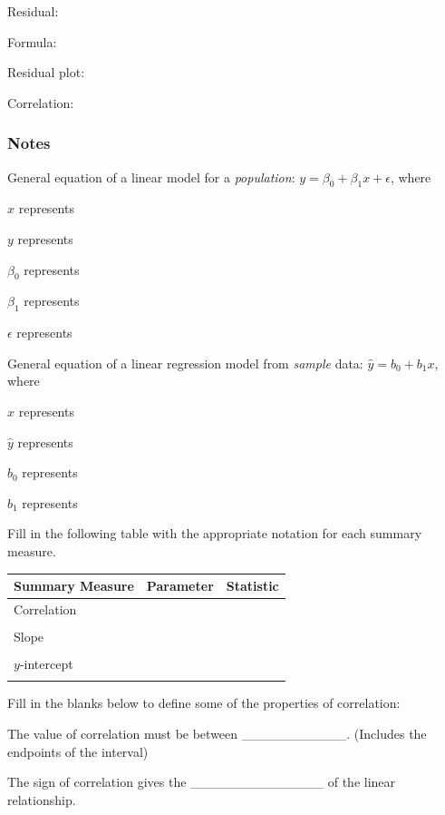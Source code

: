 \documentclass[
]{report}
\newcommand{\rgs}{\vspace{12pt}} %
\newcommand{\rgi}{\hspace{24pt}}  %
\begin{document}
Residual:
\rgs

\rgi Formula:
\rgs

Residual plot:
\rgs

Correlation:
\rgs

\hypertarget{notes-8}{%
\subsubsection*{Notes}\label{notes-8}}

General equation of a linear model for a \emph{population}: \(y= \beta_0+ \beta_1 x+\epsilon\), where

\rgi \(x\) represents
\rgs

\rgi \(y\) represents
\rgs

\rgi \(\beta_0\) represents
\rgs

\rgi \(\beta_1\) represents
\rgs

\rgi \(\epsilon\) represents
\rgs

General equation of a linear regression model from \emph{sample} data: \(\hat{y}= b_0+ b_1 x\), where

\rgi \(x\) represents
\rgs

\rgi \(\hat{y}\) represents
\rgs

\rgi \(b_0\) represents
\rgs

\rgi \(b_1\) represents
\rgs

Fill in the following table with the appropriate notation for each summary measure.

\begin{center}
\begin{tabular}{|l|p{2in}|p{2in}|} \hline
Summary Measure & Parameter & Statistic \\ \hline
Correlation & & \\ 
& & \\ \hline
Slope & & \\ 
& & \\ \hline
$y$-intercept & & \\ 
& & \\ \hline
\end{tabular}
\end{center}

Fill in the blanks below to define some of the properties of correlation:

\rgi The value of correlation must be between \_\_\_\_\_\_\_\_\_\_\_. (Includes the endpoints of the interval)

\rgi The sign of correlation gives the \_\_\_\_\_\_\_\_\_\_\_\_\_\_ of the linear relationship.
\end{document}
